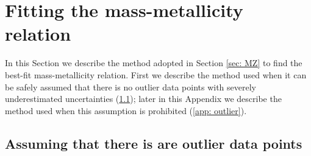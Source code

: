 \documentclass[twocolumn]{aastex631}
\begin{document}






\appendix

\section{Fitting the mass-metallicity relation} \label{app: MZ relation}

In this Section we describe the method adopted in Section \ref{sec: MZ} to find the best-fit mass-metallicity relation. First we describe the method used when it can be safely assumed that there is no outlier data points with severely underestimated uncertainties (\ref{app: no outlier}); later in this Appendix we describe the method used when this assumption is prohibited (\ref{app: outlier}).

\subsection{Assuming that there is are outlier data points} \label{app: no outlier}
\end{document}
